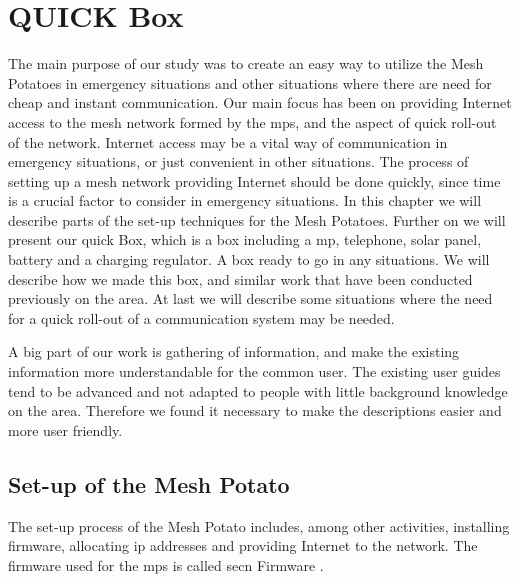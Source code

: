 \chapter{QUICK Box}
\label{chp:quickrollout} 

The main purpose of our study was to create an easy way to utilize the Mesh Potatoes in emergency situations and other situations where there are need for cheap and instant communication. Our main focus has been on providing Internet access to the mesh network formed by the \glspl{mp}, and the aspect of quick roll-out of the network. Internet access may be a vital way of communication in emergency situations, or just convenient in other situations. The process of setting up a mesh network providing Internet should be done quickly, since time is a crucial factor to consider in emergency situations. In this chapter we will describe parts of the set-up techniques for the Mesh Potatoes. Further on we will present our \gls{quick} Box, which is a box including a \gls{mp}, telephone, solar panel, battery and a charging regulator. A box ready to go in any situations. We will describe how we made this box, and similar work that have been conducted previously on the area. At last we will describe some situations where the need for a quick roll-out of a communication system may be needed. 

A big part of our work is gathering of information, and make the existing information more understandable for the common user. The existing user guides tend to be advanced and not adapted to people with little background knowledge on the area. Therefore we found it necessary to make the descriptions easier and more user friendly. 

\section{Set-up of the Mesh Potato}
The set-up process of the Mesh Potato includes, among other activities, installing firmware, allocating \gls{ip} addresses and providing Internet to the network. The firmware used for the \glspl{mp} is called \gls{secn} Firmware \cite{ChoosingFirmware}. 

